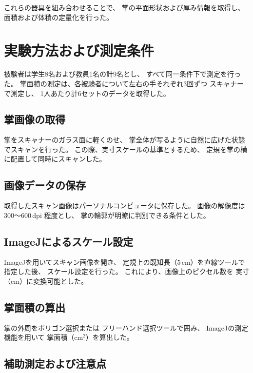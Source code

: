 これらの器具を組み合わせることで、
掌の平面形状および厚み情報を取得し、
面積および体積の定量化を行った。


\section{実験方法および測定条件}

被験者は学生8名および教員1名の計9名とし、
すべて同一条件下で測定を行った。
掌面積の測定は、各被験者について左右の手それぞれ3回ずつ
スキャナーで測定し、
1人あたり計6セットのデータを取得した。

\subsection{掌画像の取得}

掌をスキャナーのガラス面に軽くのせ、
掌全体が写るように自然に広げた状態でスキャンを行った。
この際、実寸スケールの基準とするため、
定規を掌の横に配置して同時にスキャンした。

\subsection{画像データの保存}

取得したスキャン画像はパーソナルコンピュータに保存した。
画像の解像度は300～600\,dpi 程度とし、
掌の輪郭が明瞭に判別できる条件とした。

\subsection{ImageJによるスケール設定}

ImageJを用いてスキャン画像を開き、
定規上の既知長（5\,cm）を直線ツールで指定した後、
スケール設定を行った。
これにより、画像上のピクセル数を
実寸（cm）に変換可能とした。

\subsection{掌面積の算出}

掌の外周をポリゴン選択または
フリーハンド選択ツールで囲み、
ImageJの測定機能を用いて
掌面積（cm$^2$）を算出した。

\subsection{補助測定および注意点}


